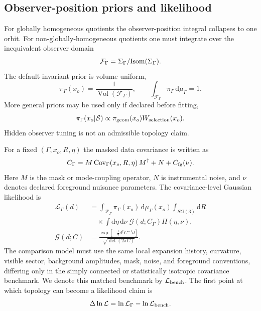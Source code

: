 \documentclass[
  aps,
  prd,
  reprint,
  superscriptaddress,
  floatfix,
  nofootinbib,
  longbibliography
]{revtex4-2}
\theoremstyle{plain}
\theoremstyle{definition}
\theoremstyle{remark}
\newcommand{\dd}{\mathrm d}
\DeclareMathOperator{\Vol}{Vol}
\begin{document}
\subsection{Observer-position priors and likelihood}

For globally homogeneous quotients the observer-position integral collapses to
one orbit.  For non-globally-homogeneous quotients one must integrate over the
inequivalent observer domain
\begin{equation}
\mathcal F_\Gamma=\Sigma_\Gamma/{\rm Isom}(\Sigma_\Gamma) .
\end{equation}
The default invariant prior is volume-uniform,
\begin{equation}
\pi_\Gamma(x_o)=\frac{1}{\Vol(\mathcal F_\Gamma)},
\qquad
\int_{\mathcal F_\Gamma}\pi_\Gamma\,\dd\mu_\Gamma=1 .
\end{equation}
More general priors may be used only if declared before fitting,
\begin{equation}
\pi_\Gamma(x_o|\mathcal S)\propto
\pi_{\rm geom}(x_o)W_{\rm selection}(x_o) .
\end{equation}
Hidden observer tuning is not an admissible topology claim.

For a fixed $(\Gamma,x_o,R,\eta)$ the masked data covariance is written as
\begin{equation}
C_\Gamma=M\,{\rm Cov}_\Gamma(x_o,R,\eta)\,M^\dagger+N+C_{\rm fg}(\nu) .
\end{equation}
Here $M$ is the mask or mode-coupling operator, $N$ is instrumental noise, and
$\nu$ denotes declared foreground nuisance parameters.  The covariance-level
Gaussian likelihood is
\begin{align}
\mathcal L_\Gamma(d)
&=
\int_{\mathcal F_\Gamma}\pi_\Gamma(x_o)\,\dd\mu_\Gamma(x_o)
\int_{SO(3)}\dd R
\nonumber\\
&\quad\times
\int\dd\eta\,\dd\nu\;
\mathcal G(d;C_\Gamma)\Pi(\eta,\nu),
\label{eq:likelihood_v16}\\
\mathcal G(d;C)&=
\frac{\exp[-\frac{1}{2}d^\dagger C^{-1}d]}{\sqrt{\det(2\pi C)}} .
\end{align}
The comparison model must use the same local expansion history, curvature,
visible sector, background amplitudes, mask, noise, and foreground conventions,
differing only in the simply connected or statistically isotropic covariance
benchmark.  We denote this matched benchmark by \(\mathcal L_{\rm bench}\).  The
first point at which topology can become a likelihood claim is
\begin{equation}
\Delta\ln\mathcal L=
\ln\mathcal L_\Gamma-
\ln\mathcal L_{\rm bench} .
\end{equation}
\end{document}
